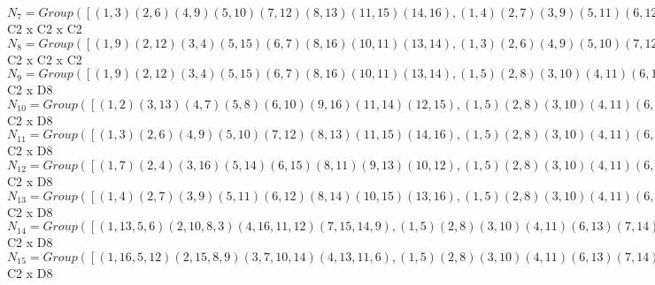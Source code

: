 \documentclass[varwidth=\maxdimen,border=10]{standalone}
\begin{document}
\begin{tabular}
$N_{7} = Group( [ ( 1, 3)( 2, 6)( 4, 9)( 5,10)( 7,12)( 8,13)(11,15)(14,16), ( 1, 4)( 2, 7)( 3, 9)( 5,11)( 6,12)( 8,14)(10,15)(13,16), ( 1,11)( 2,14)( 3,15)( 4, 5)( 6,16)( 7, 8)( 9,10)(12,13) ] )\cong$ C2 x C2 x C2\ \\
$N_{8} = Group( [ ( 1, 9)( 2,12)( 3, 4)( 5,15)( 6, 7)( 8,16)(10,11)(13,14), ( 1, 3)( 2, 6)( 4, 9)( 5,10)( 7,12)( 8,13)(11,15)(14,16), ( 1, 4)( 2, 7)( 3, 9)( 5,11)( 6,12)( 8,14)(10,15)(13,16), ( 1,10)( 2,13)( 3, 5)( 4,15)( 6, 8)( 7,16)( 9,11)(12,14) ] )\cong$ C2 x C2 x C2\ \\
$N_{9} = Group( [ ( 1, 9)( 2,12)( 3, 4)( 5,15)( 6, 7)( 8,16)(10,11)(13,14), ( 1, 5)( 2, 8)( 3,10)( 4,11)( 6,13)( 7,14)( 9,15)(12,16), ( 1, 2)( 3,13)( 4, 7)( 5, 8)( 6,10)( 9,16)(11,14)(12,15), ( 1, 3)( 2, 6)( 4, 9)( 5,10)( 7,12)( 8,13)(11,15)(14,16) ] )\cong$ C2 x D8\ \\
$N_{10} = Group( [ ( 1, 2)( 3,13)( 4, 7)( 5, 8)( 6,10)( 9,16)(11,14)(12,15), ( 1, 5)( 2, 8)( 3,10)( 4,11)( 6,13)( 7,14)( 9,15)(12,16), ( 1, 3)( 2, 6)( 4, 9)( 5,10)( 7,12)( 8,13)(11,15)(14,16), ( 1, 4)( 2, 7)( 3, 9)( 5,11)( 6,12)( 8,14)(10,15)(13,16) ] )\cong$ C2 x D8\ \\
$N_{11} = Group( [ ( 1, 3)( 2, 6)( 4, 9)( 5,10)( 7,12)( 8,13)(11,15)(14,16), ( 1, 5)( 2, 8)( 3,10)( 4,11)( 6,13)( 7,14)( 9,15)(12,16), ( 1, 2)( 3,13)( 4, 7)( 5, 8)( 6,10)( 9,16)(11,14)(12,15), ( 1, 4)( 2, 7)( 3, 9)( 5,11)( 6,12)( 8,14)(10,15)(13,16) ] )\cong$ C2 x D8\ \\
$N_{12} = Group( [ ( 1, 7)( 2, 4)( 3,16)( 5,14)( 6,15)( 8,11)( 9,13)(10,12), ( 1, 5)( 2, 8)( 3,10)( 4,11)( 6,13)( 7,14)( 9,15)(12,16), ( 1, 2)( 3,13)( 4, 7)( 5, 8)( 6,10)( 9,16)(11,14)(12,15), ( 1, 3)( 2, 6)( 4, 9)( 5,10)( 7,12)( 8,13)(11,15)(14,16) ] )\cong$ C2 x D8\ \\
$N_{13} = Group( [ ( 1, 4)( 2, 7)( 3, 9)( 5,11)( 6,12)( 8,14)(10,15)(13,16), ( 1, 5)( 2, 8)( 3,10)( 4,11)( 6,13)( 7,14)( 9,15)(12,16), ( 1, 2)( 3,13)( 4, 7)( 5, 8)( 6,10)( 9,16)(11,14)(12,15), ( 1, 3)( 2, 6)( 4, 9)( 5,10)( 7,12)( 8,13)(11,15)(14,16) ] )\cong$ C2 x D8\ \\
$N_{14} = Group( [ ( 1,13, 5, 6)( 2,10, 8, 3)( 4,16,11,12)( 7,15,14, 9), ( 1, 5)( 2, 8)( 3,10)( 4,11)( 6,13)( 7,14)( 9,15)(12,16), ( 1, 2)( 3,13)( 4, 7)( 5, 8)( 6,10)( 9,16)(11,14)(12,15), ( 1, 4)( 2, 7)( 3, 9)( 5,11)( 6,12)( 8,14)(10,15)(13,16) ] )\cong$ C2 x D8\ \\
$N_{15} = Group( [ ( 1,16, 5,12)( 2,15, 8, 9)( 3, 7,10,14)( 4,13,11, 6), ( 1, 5)( 2, 8)( 3,10)( 4,11)( 6,13)( 7,14)( 9,15)(12,16), ( 1, 2)( 3,13)( 4, 7)( 5, 8)( 6,10)( 9,16)(11,14)(12,15), ( 1, 3)( 2, 6)( 4, 9)( 5,10)( 7,12)( 8,13)(11,15)(14,16) ] )\cong$ C2 x D8\ \\

\end{tabular}
\end{document}
